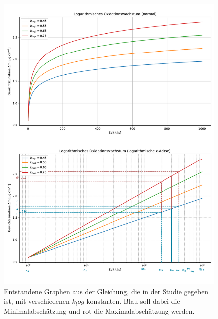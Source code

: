 \onecolumn
\begin{figure}[h!]
    \vspace{1.75cm}
    \includegraphics[width=\textwidth, page=2]{img/21/Plots_oxi-eingezeichnet.pdf}
    \caption{Entstandene Graphen aus der Gleichung, die in der Studie gegeben ist, mit verschiedenen $k_log$ konstanten. Blau soll dabei die Minimalabschätzung und rot die Maximalabschätzung werden.}
    \label{fig:log_gezeichnet}
\end{figure}
\twocolumn
